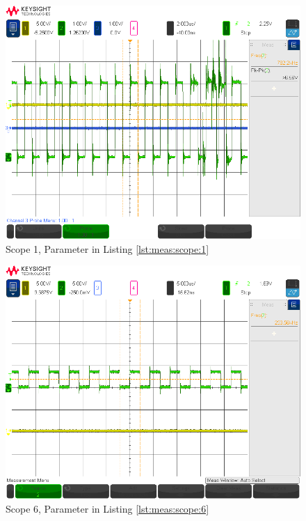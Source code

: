 \begin{figure}[h!tb]
    \centering
    \includegraphics[width=1\textwidth, trim=0mm 21mm 0mm 11mm, clip]{images/scopeShots/scope_1b.png}
    \caption{Scope 1, Parameter in Listing \ref{lst:meas:scope:1}}
    \label{fig:meas:scope:1}
\end{figure}

\begin{figure}[h!tb]
    \centering
    \includegraphics[width=1\textwidth, trim=0mm 21mm 0mm 11mm, clip]{images/scopeShots/scope_6b.png}
    \caption{Scope 6, Parameter in Listing \ref{lst:meas:scope:6}}
    \label{fig:meas:scope:6}
\end{figure}


